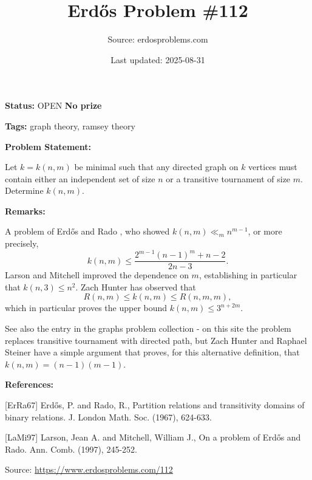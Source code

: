\documentclass{article}
\title{Erd\H{o}s Problem \#112}
\date{Last updated: 2025-08-31}
\author{Source: erdosproblems.com}
\begin{document}
\maketitle

\noindent\textbf{Status:} OPEN \quad \textbf{No prize}

\noindent\textbf{Tags:} graph theory, ramsey theory

\medskip
\noindent\textbf{Problem Statement:}

Let $k=k(n,m)$ be minimal such that any directed graph on $k$ vertices must contain either an independent set of size $n$ or a transitive tournament of size $m$. Determine $k(n,m)$.

\bigskip
\noindent\textbf{Remarks:}

A problem of Erd\H{o}s and Rado \cite{ErRa67}, who showed $k(n,m) \ll_m n^{m-1}$, or more precisely,\[k(n,m) \leq \frac{2^{m-1}(n-1)^m+n-2}{2n-3}.\]Larson and Mitchell \cite{LaMi97} improved the dependence on $m$, establishing in particular that $k(n,3)\leq n^{2}$. Zach Hunter has observed that\[R(n,m) \leq k(n,m)\leq R(n,m,m),\]which in particular proves the upper bound $k(n,m)\leq 3^{n+2m}$.

See also the entry in the graphs problem collection - on this site the problem replaces transitive tournament with directed path, but Zach Hunter and Raphael Steiner have a simple argument that proves, for this alternative definition, that $k(n,m)=(n-1)(m-1)$.

\bigskip
\noindent\textbf{References:}

[ErRa67] Erd\H{o}s, P. and Rado, R., Partition relations and transitivity domains of binary
relations. J. London Math. Soc. (1967), 624-633.
 
 [LaMi97] Larson, Jean A. and Mitchell, William J., On a problem of Erd\H{o}s and Rado. Ann. Comb. (1997), 245-252.

\bigskip
\noindent\small{Source: \url{https://www.erdosproblems.com/112}}
\end{document}
